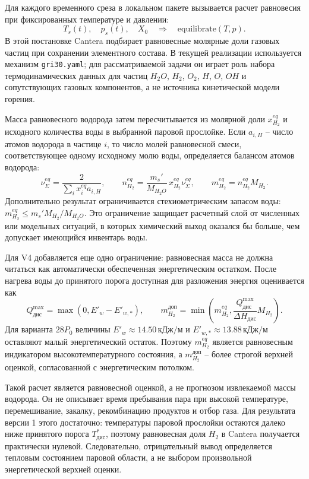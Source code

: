 \documentclass[12pt]{article}
\begin{document}
Для каждого временного среза в локальном пакете вызывается расчет равновесия при фиксированных температуре и давлении:
\[
T_s(t),\quad p_s(t),\quad X_0
\quad\Longrightarrow\quad
\mathrm{equilibrate}(T,p).
\]
В этой постановке Cantera подбирает равновесные молярные доли газовых частиц при сохранении элементного состава. В текущей реализации используется механизм \texttt{gri30.yaml}; для рассматриваемой задачи он играет роль набора термодинамических данных для частиц \(H_2O\), \(H_2\), \(O_2\), \(H\), \(O\), \(OH\) и сопутствующих газовых компонентов, а не источника кинетической модели горения.

Масса равновесного водорода затем пересчитывается из молярной доли \(x_{H_2}^{eq}\) и исходного количества воды в выбранной паровой прослойке. Если \(a_{i,H}\) -- число атомов водорода в частице \(i\), то число молей равновесной смеси, соответствующее одному исходному молю воды, определяется балансом атомов водорода:
\[
\nu_{\Sigma}^{eq}=
\frac{2}{\sum_i x_i^{eq}a_{i,H}},
\qquad
n_{H_2}^{eq}=
\frac{m_s'}{M_{H_2O}}\,
x_{H_2}^{eq}\nu_{\Sigma}^{eq},
\qquad
m_{H_2}^{eq}=n_{H_2}^{eq}M_{H_2}.
\]
Дополнительно результат ограничивается стехиометрическим запасом воды: \(m_{H_2}^{eq}\le m_s'M_{H_2}/M_{H_2O}\). Это ограничение защищает расчетный слой от численных или модельных ситуаций, в которых химический выход оказался бы больше, чем допускает имеющийся инвентарь воды.

Для V4 добавляется еще одно ограничение: равновесная масса не должна читаться как автоматически обеспеченная энергетическим остатком. После нагрева воды до принятого порога доступная для разложения энергия оценивается как
\[
Q_{\mathrm{дис}}^{\max}=\max(0,E'_w-E'_{w,*}),
\qquad
m_{H_2}^{\mathrm{доп}}=
\min\left(
m_{H_2}^{eq},
\frac{Q_{\mathrm{дис}}^{\max}}{\Delta H_{\mathrm{дис}}}M_{H_2}
\right).
\]
Для варианта \(28P_0\) величины \(E'_w\approx14.50\,\mathrm{кДж/м}\) и \(E'_{w,*}\approx13.88\,\mathrm{кДж/м}\) оставляют малый энергетический остаток. Поэтому \(m_{H_2}^{eq}\) является равновесным индикатором высокотемпературного состояния, а \(m_{H_2}^{\mathrm{доп}}\) -- более строгой верхней оценкой, согласованной с энергетическим потолком.

Такой расчет является равновесной оценкой, а не прогнозом извлекаемой массы водорода. Он не описывает время пребывания пара при высокой температуре, перемешивание, закалку, рекомбинацию продуктов и отбор газа. Для результата версии 1 этого достаточно: температуры паровой прослойки остаются далеко ниже принятого порога \(T^*_{\mathrm{дис}}\), поэтому равновесная доля \(H_2\) в Cantera получается практически нулевой. Следовательно, отрицательный вывод определяется тепловым состоянием паровой области, а не выбором произвольной энергетической верхней оценки.
\end{document}
